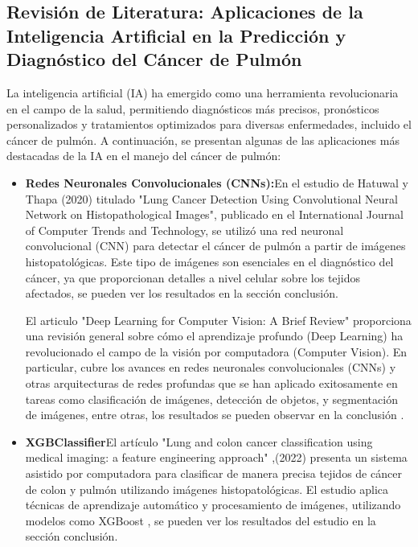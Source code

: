 
\subsection{Revisión de Literatura: Aplicaciones de la Inteligencia Artificial en la Predicción y Diagnóstico del Cáncer de Pulmón}
La inteligencia artificial (IA) ha emergido como una herramienta revolucionaria en el campo de la salud, permitiendo diagnósticos más precisos, pronósticos personalizados y tratamientos optimizados para diversas enfermedades, incluido el cáncer de pulmón. A continuación, se presentan algunas de las aplicaciones más destacadas de la IA en el manejo del cáncer de pulmón:

\begin{itemize}
    \item \textbf{Redes Neuronales Convolucionales (CNNs):}En el estudio de Hatuwal y Thapa (2020) titulado "Lung Cancer Detection Using Convolutional Neural Network on Histopathological Images", publicado en el International Journal of Computer Trends and Technology\parencite{CNN1}, se utilizó una red neuronal convolucional (CNN) para detectar el cáncer de pulmón a partir de imágenes histopatológicas. Este tipo de imágenes son esenciales en el diagnóstico del cáncer, ya que proporcionan detalles a nivel celular sobre los tejidos afectados, se pueden ver los resultados en la sección conclusión.

    El articulo "Deep Learning for Computer Vision: A Brief Review" proporciona una revisión general sobre cómo el aprendizaje profundo (Deep Learning) ha revolucionado el campo de la visión por computadora (Computer Vision). En particular, cubre los avances en redes neuronales convolucionales (CNNs) y otras arquitecturas de redes profundas que se han aplicado exitosamente en tareas como clasificación de imágenes, detección de objetos, y segmentación de imágenes, entre otras, los resultados se pueden observar en la conclusión \parencite{CNN2}.
    
    \item\textbf{XGBClassifier}El artículo "Lung and colon cancer classification using medical imaging: a feature engineering approach" ,(2022) presenta un sistema asistido por computadora para clasificar de manera precisa tejidos de cáncer de colon y pulmón utilizando imágenes histopatológicas. El estudio aplica técnicas de aprendizaje automático y procesamiento de imágenes, utilizando modelos como XGBoost \parencite{modelo_XGBClassifier}, se pueden ver los resultados del estudio en la sección conclusión.


\end{itemize}

